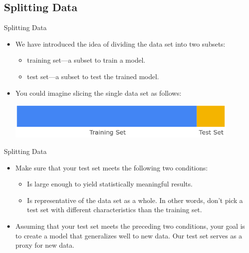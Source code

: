 \documentclass{beamer}
\begin{document}
\subsection{Splitting Data}

\begin{frame}{Splitting Data}
\begin{itemize}
    \item We have introduced the idea of dividing the data set into two subsets:
    \begin{itemize}
        \item training set—a subset to train a model.
        \item test set—a subset to test the trained model.
    \end{itemize}
    \item You could imagine slicing the single data set as follows:
    
    \medskip
    \includegraphics[width=0.9\textwidth]{images/PartitionTwoSets.png}
\end{itemize}
\end{frame}

\begin{frame}{Splitting Data}
\begin{itemize}
    \item Make sure that your test set meets the following two conditions:
    \begin{itemize}
        \item Is large enough to yield statistically meaningful results.
        \item Is representative of the data set as a whole. In other words, don't pick a test set with different characteristics than the training set.
    \end{itemize}
    \item Assuming that your test set meets the preceding two conditions, your goal is to create a model that generalizes well to new data. Our test set serves as a proxy for new data. 
\end{itemize}
\end{frame}
\end{document}
